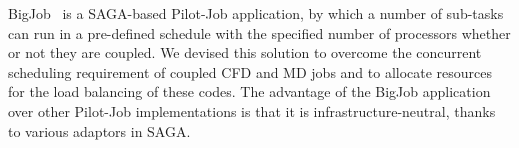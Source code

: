 \documentclass[preprint,12pt]{elsarticle}
\newcommand{\skonote}[1]{ {\textcolor{green} { ***Jeff: #1 }}}
\newcommand{\skonote}[1]{}
\begin{document}



BigJob~\cite{saga_royalsoc} is a SAGA-based Pilot-Job application, by which a number of sub-tasks can run in a pre-defined schedule with the specified number of processors whether or not they are coupled. We devised this solution to overcome the concurrent scheduling requirement of coupled CFD and MD jobs and to allocate resources for the load balancing of these codes. The advantage of the BigJob application over other Pilot-Job implementations is that it is infrastructure-neutral, thanks to various adaptors in SAGA.

\end{document}
